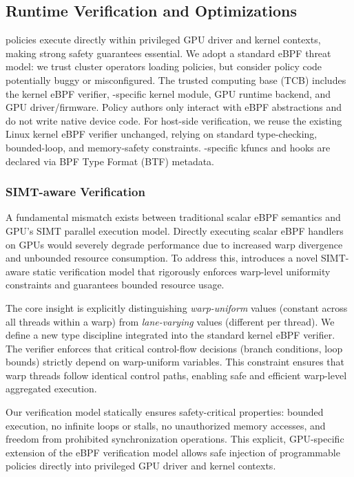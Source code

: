 \subsection{Runtime Verification and Optimizations}
\label{sec:verification}

\sys policies execute directly within privileged GPU driver and kernel contexts, making strong safety guarantees essential. We adopt a standard eBPF threat model: we trust cluster operators loading policies, but consider policy code potentially buggy or misconfigured. The trusted computing base (TCB) includes the kernel eBPF verifier, \sys-specific kernel module, GPU runtime backend, and GPU driver/firmware. Policy authors only interact with eBPF abstractions and do not write native device code. For host-side verification, we reuse the existing Linux kernel eBPF verifier unchanged, relying on standard type-checking, bounded-loop, and memory-safety constraints. \sys-specific kfuncs and hooks are declared via BPF Type Format (BTF) metadata.

\subsubsection{SIMT-aware Verification}

A fundamental mismatch exists between traditional scalar eBPF semantics and GPU's SIMT parallel execution model. Directly executing scalar eBPF handlers on GPUs would severely degrade performance due to increased warp divergence and unbounded resource consumption. To address this, \sys introduces a novel SIMT-aware static verification model that rigorously enforces warp-level uniformity constraints and guarantees bounded resource usage.

The core insight is explicitly distinguishing \emph{warp-uniform} values (constant across all threads within a warp) from \emph{lane-varying} values (different per thread). We define a new type discipline integrated into the standard kernel eBPF verifier. The verifier enforces that critical control-flow decisions (branch conditions, loop bounds) strictly depend on warp-uniform variables. This constraint ensures that warp threads follow identical control paths, enabling safe and efficient warp-level aggregated execution.

Our verification model statically ensures safety-critical properties: bounded execution, no infinite loops or stalls, no unauthorized memory accesses, and freedom from prohibited synchronization operations. This explicit, GPU-specific extension of the eBPF verification model allows safe injection of programmable policies directly into privileged GPU driver and kernel contexts.

